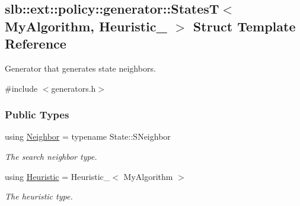 \hypertarget{structslb_1_1ext_1_1policy_1_1generator_1_1StatesT}{}\subsection{slb\+:\+:ext\+:\+:policy\+:\+:generator\+:\+:StatesT$<$ My\+Algorithm, Heuristic\+\_\+ $>$ Struct Template Reference}
\label{structslb_1_1ext_1_1policy_1_1generator_1_1StatesT}


Generator that generates state neighbors.  




{\ttfamily \#include $<$generators.\+h$>$}

\subsubsection*{Public Types}
\begin{DoxyCompactItemize}
\item 
using \hyperlink{structslb_1_1ext_1_1policy_1_1generator_1_1StatesT_aa66abe249317f4cb57225481bb25a1f9}{Neighbor} = typename State\+::\+S\+Neighbor\hypertarget{structslb_1_1ext_1_1policy_1_1generator_1_1StatesT_aa66abe249317f4cb57225481bb25a1f9}{}\label{structslb_1_1ext_1_1policy_1_1generator_1_1StatesT_aa66abe249317f4cb57225481bb25a1f9}

\begin{DoxyCompactList}\small\item\em The search neighbor type. \end{DoxyCompactList}\item 
using \hyperlink{structslb_1_1ext_1_1policy_1_1generator_1_1StatesT_a3d4d943f982860608b5bffd4afd20fae}{Heuristic} = Heuristic\+\_\+$<$ My\+Algorithm $>$\hypertarget{structslb_1_1ext_1_1policy_1_1generator_1_1StatesT_a3d4d943f982860608b5bffd4afd20fae}{}\label{structslb_1_1ext_1_1policy_1_1generator_1_1StatesT_a3d4d943f982860608b5bffd4afd20fae}

\begin{DoxyCompactList}\small\item\em The heuristic type. \end{DoxyCompactList}\end{DoxyCompactItemize}
